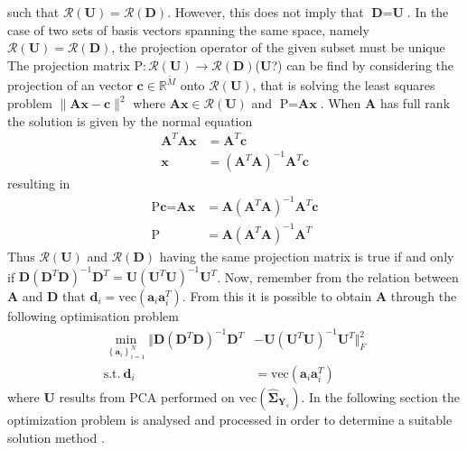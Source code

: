   
 such that $\mathcal{R}(\textbf{U})=\mathcal{R}(\textbf{D})$. 
However, this does not imply that $\textbf{D}=\textbf{U}$. 
In the case of two sets of basis vectors spanning the same space, namely $\mathcal{R}(\textbf{U})=\mathcal{R}(\textbf{D})$, the projection operator of the given subset must be unique  
The projection matrix $\text{P}:\mathcal{R}(\textbf{U})\rightarrow \mathcal{R}(\textbf{D})$($\textbf{U}$?) can be find by considering the projection of an vector $\textbf{c}\in \mathbb{R}^{\widetilde{M}}$ onto $\mathcal{R}(\textbf{U})$, that is solving the least squares problem $\| \textbf{Ax}-\textbf{c}\|^{2}$ where $\textbf{Ax}\in \mathcal{R}(\textbf{U})$ and $\text{P} = \textbf{Ax}$. When $\textbf{A}$ has full rank the solution is given by the normal equation
\begin{align*}
\textbf{A}^T\textbf{A}\textbf{x} &= \textbf{A}^T\textbf{c}\\
\textbf{x} &= (\textbf{A}^T\textbf{A})^{-1}\textbf{A}^T\textbf{c}
\end{align*}	
resulting in
\begin{align*}
\text{P}\textbf{c} = \textbf{Ax} &= \textbf{A}(\textbf{A}^T\textbf{A})^{-1}\textbf{A}^T\textbf{c}\\
\text{P} &= \textbf{A}(\textbf{A}^T\textbf{A})^{-1}\textbf{A}^T 
\end{align*} 
Thus $\mathcal{R}(\textbf{U})$ and $\mathcal{R}(\textbf{D})$ having the same projection matrix is true if and only if $\textbf{D}(\textbf{D}^T\textbf{D})^{-1}\textbf{D}^T=\textbf{U}(\textbf{U}^T\textbf{U})^{-1}\textbf{U}^T$. 
Now, remember from the relation between $\textbf{A}$ and $\textbf{D}$ that $\textbf{d}_i = \text{vec}(\textbf{a}_i\textbf{a}_i^T)$. 
From this it is possible to obtain $\textbf{A}$ through the following optimisation problem 
\begin{align}
\min_{\left\{\textbf{a}_i\right\}_{i = 1}^{N}}\Vert  \textbf{D}(\textbf{D}^T\textbf{D})^{-1}\textbf{D}^T &- \textbf{U}(\textbf{U}^T\textbf{U})^{-1}\textbf{U}^T \Vert_{F}^{2} \nonumber \\
\text{s.t.} \ \textbf{d}_i&=\text{vec}(\textbf{a}_i\textbf{a}_i^T)\label{eq:Cov_DL2}
\end{align}      
where $\textbf{U}$ results from PCA performed on $\text{vec}(\widehat{\boldsymbol{\Sigma}}_{\textbf{Y}_s})$.
In the following section the optimization problem is analysed and processed in order to determine a suitable solution method . 

